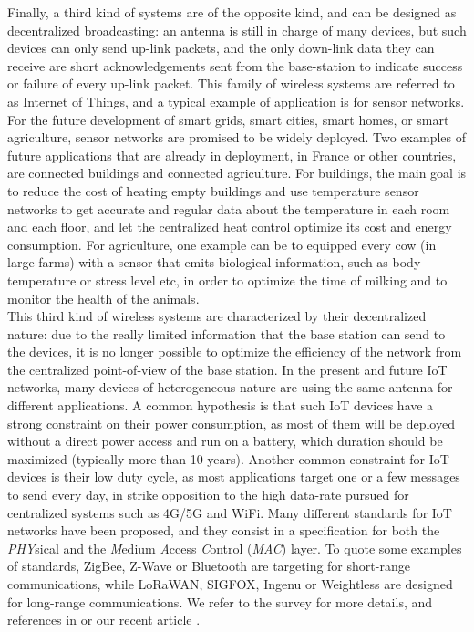 Finally, a third kind of systems are of the opposite kind, and can be designed as decentralized broadcasting: an antenna is still in charge of many devices, but such devices can only send up-link packets, and the only down-link data they can receive are short acknowledgements sent from the base-station to indicate success or failure of every up-link packet.
This family of wireless systems are referred to as Internet of Things,
and a typical example of application is for sensor networks.\\
\indent
For the future development of smart grids, smart cities, smart homes, or smart agriculture, sensor networks are promised to be widely deployed.
Two examples of future applications that are already in deployment, in France or other countries, are connected buildings and connected agriculture.
For buildings, the main goal is to reduce the cost of heating empty buildings and use temperature sensor networks to get accurate and regular data about the temperature in each room and each floor, and let the centralized heat control optimize its cost and energy consumption.
For agriculture, one example can be to equipped every cow (in large farms) with a sensor that emits biological information, such as body temperature or stress level etc, in order to optimize the time of milking and to monitor the health of the animals.\\
%
\indent
This third kind of wireless systems are characterized by their decentralized nature: due to the really limited information that the base station can send to the devices, it is no longer possible to optimize the efficiency of the network from the centralized point-of-view of the base station.
In the present and future IoT networks, many devices of heterogeneous nature are using the same antenna for different applications.
A common hypothesis is that such IoT devices have a strong constraint on their power consumption, as most of them will be deployed without a direct power access and run on a battery, which duration should be maximized (typically more than 10 years).
Another common constraint for IoT devices is their low duty cycle, as most applications target one or a few messages to send every day, in strike opposition to the high data-rate pursued for centralized systems such as 4G/5G and WiFi.
%
Many different standards for IoT networks have been proposed,
and they consist in a specification for both the \emph{PHY}sical
and the \emph{M}edium \emph{A}ccess \emph{C}ontrol (\emph{MAC}) layer.
To quote some examples of standards, ZigBee, Z-Wave or Bluetooth are targeting for short-range communications, while LoRaWAN, SIGFOX, Ingenu or Weightless are designed for long-range communications.
We refer to the survey \cite{Centenaro16} for more details, and references in \cite{Azari18} or our recent article \cite{MoyBesson2019}.

